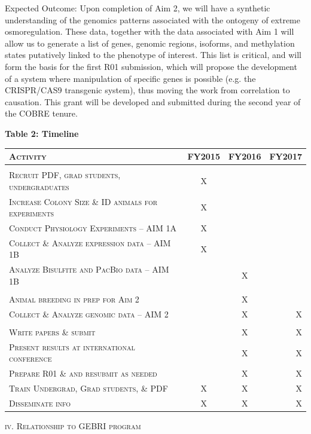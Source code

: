 \documentclass[11pt]{article}
\begin{document}
Expected Outcome: Upon completion of Aim 2, we will have a synthetic understanding of the genomics patterns associated with the ontogeny of extreme osmoregulation. These data, together with the data associated with Aim 1 will allow us to generate a list of genes, genomic regions, isoforms, and methylation states putatively linked to the phenotype of interest. This list is critical, and will form the basis for the first R01 submission, which will propose the development of a system where manipulation of specific genes is possible (e.g. the CRISPR/CAS9 transgenic system), thus moving the work from correlation to causation. This grant will be developed and submitted during the second year of the COBRE tenure.

\vspace{7mm}
\textbf{Table 2: Timeline}
\hypertarget{Table 2}{}
\begin{center}
\begin{tabular}{l|c c r}

\textsc{Activity} & \textsc{FY2015} & \textsc{FY2016} & \textsc{FY2017} \\
\hline \\
\textsc{Recruit PDF, grad students, undergraduates} & X & & \\
\textsc{Increase Colony Size \& ID animals for experiments } & X & & \\
\textsc{Conduct Physiology Experiments -- AIM 1A} & X & & \\
\textsc{Collect \& Analyze expression data -- AIM 1B} & X & & \\
\textsc{Analyze Bisulfite and PacBio data -- AIM 1B} & & X & \\
\textsc{} & &  &   \\
\textsc{Animal breeding in prep for Aim 2} & & X &  \\
\textsc{Collect \& Analyze genomic data -- AIM 2} & & X & X \\
\textsc{} & &  &   \\
\textsc{Write papers \& submit} & & X & X \\
\textsc{Present results at international conference} & & X & X \\
\textsc{Prepare R01 \& and resubmit as needed} & & X & X \\
\textsc{Train Undergrad, Grad students, \& PDF} & X & X & X \\
\textsc{Disseminate info} & X & X & X \\

\end{tabular}
\end{center}
\vspace{5mm}
\normalsize 
\begin{center}
\textsc{{iv. Relationship to GEBRI program}} \\
\end{center}
\end{document}
